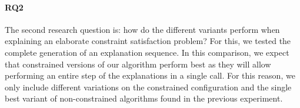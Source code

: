 

\paragraph{RQ2}
The second research question is: how do the different variants perform when explaining an elaborate constraint satisfaction problem? For this, we tested the complete generation of an explanation sequence. 
In this comparison, we expect that constrained versions of our algorithm perform best as they will allow performing an entire step of the explanations in a single call.
For this reason, we only include different variations on the constrained configuration and the single best variant of non-constrained algorithms found in the previous experiment. 


